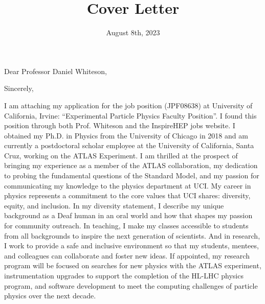 \documentclass[10pt,letterpaper,sans]{moderncv} %
\title{Cover Letter}
\begin{document}
\date{August 8th, 2023}
\opening{Dear Professor Daniel Whiteson,}
\closing{Sincerely,}

\makelettertitle
\vspace*{-1em}

I am attaching my application for the job position (JPF08638) at University of California, Irvine: ``Experimental Particle Physics Faculty Position''. I found this position through both Prof. Whiteson and the InspireHEP jobs website. I obtained my Ph.D. in Physics from the University of Chicago in 2018 and am currently a postdoctoral scholar employee at the University of California, Santa Cruz, working on the ATLAS Experiment. I am thrilled at the prospect of bringing my experience as a member of the ATLAS collaboration, my dedication to probing the fundamental questions of the Standard Model, and my passion for communicating my knowledge to the physics department at UCI. My career in physics represents a commitment to the core values that UCI shares: diversity, equity, and inclusion. In my diversity statement, I describe my unique background as a Deaf human in an oral world and how that shapes my passion for community outreach. In teaching, I make my classes accessible to students from all backgrounds to inspire the next generation of scientists. And in research, I work to provide a safe and inclusive environment so that my students, mentees, and colleagues can collaborate and foster new ideas. If appointed, my research program will be focused on searches for new physics with the ATLAS experiment, instrumentation upgrades to support the completion of the HL-LHC physics program, and software development to meet the computing challenges of particle physics over the next decade.
\end{document}
